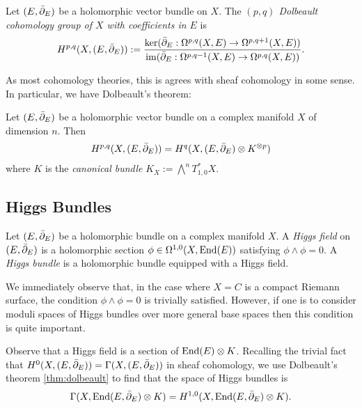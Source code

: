 \documentclass[12pt]{ociamthesis}  %
\begin{document}
\begin{definition}
  Let $(E,{\bar{\partial}}_E)$ be a holomorphic vector bundle on $X$. The
  \emph{$(p,q)$ Dolbeault cohomology group of $X$ with coefficients in
    $E$} is
  \begin{align*}
    H^{p,q}(X,(E,{\bar{\partial}}_E)) := \frac{
      \ker({\bar{\partial}}_E : \Omega^{p,q}(X,E) \to \Omega^{p,q+1}(X,E))
    }{
      \operatorname{im}({\bar{\partial}}_E : \Omega^{p,q-1}(X,E) \to \Omega^{p,q}(X,E))
    }.
  \end{align*}
\end{definition}

As most cohomology theories, this is agrees with sheaf cohomology
in some sense. In particular, we have Dolbeault's theorem:

\begin{theorem}[Dolbeault]\label{thm:dolbeault}
  Let $(E,{\bar{\partial}}_E)$ be a holomorphic vector bundle on a complex manifold
  $X$ of dimension $n$. Then
  \begin{align*}
    H^{p,q}(X,(E,{\bar{\partial}}_E)) = H^q(X,(E,{\bar{\partial}}_E)\otimes K^{\otimes p})
  \end{align*}
  where $K$ is the \emph{canonical bundle}
  $K_X := \bigwedge^n T_{1,0}^* X$.
\end{theorem}

\subsection{Higgs Bundles}


\begin{definition}
  Let $(E,{\bar{\partial}}_E)$ be a holomorphic bundle on a complex manifold $X$.
  A \emph{Higgs field} on $(E,{\bar{\partial}}_E)$ is a holomorphic section
  $\phi \in \Omega^{1,0}(X,\operatorname{End}(E))$ satisfying $\phi\wedge\phi = 0$.
  A \emph{Higgs bundle} is a holomorphic bundle equipped with
  a Higgs field.
\end{definition}
We immediately observe that, in the case where $X=C$ is a compact
Riemann surface, the condition $\phi\wedge\phi=0$ is trivially
satisfied. However, if one is to consider moduli spaces of Higgs bundles
over more general base spaces then this condition is quite important.

Observe that a Higgs field is a section of $\operatorname{End}(E) \otimes K$.
Recalling the trivial fact that $H^0(X,(E,{\bar{\partial}}_E))=\Gamma(X,(E,{\bar{\partial}}_E))$
in sheaf cohomology, we use Dolbeault's theorem \ref{thm:dolbeault} to
find that the space of Higgs bundles is
\begin{align*}
  \Gamma(X,\operatorname{End}(E,{\bar{\partial}}_E)\otimes K) = H^{1,0}(X,\operatorname{End}(E,{\bar{\partial}}_E)\otimes K).
\end{align*}
\end{document}
